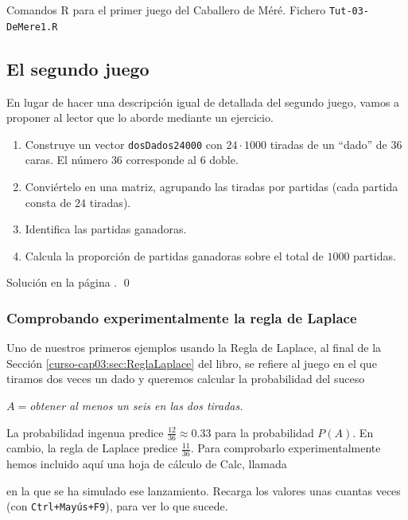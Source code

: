 \documentclass[10pt,a4paper]{article}\usepackage[]{graphicx}\usepackage[]{color}
\begin{document}
\begin{table}[h!]

\caption{Comandos R para el primer juego del Caballero de Méré. Fichero {\tt Tut-03-DeMere1.R}}
\label{tut03:tabla:FicheroTut-03-DeMere1}
\end{table}

\subsection{El segundo juego}
\label{tut03:subsec:SegundoJuego}

En lugar de hacer una descripción igual de detallada del segundo juego, vamos a proponer al lector que lo aborde mediante un ejercicio.

\begin{ejercicio}
\label{tut03:ejercicio11}
\quad
\begin{enumerate}
  \item Construye un vector {\tt dosDados24000} con $24\cdot 1000$ tiradas de un ``dado'' de 36 caras. El número $36$ corresponde al $6$ doble.
  \item Conviértelo en una matriz, agrupando las tiradas por partidas (cada partida consta de $24$ tiradas).
  \item Identifica las partidas ganadoras.
  \item Calcula la proporción de partidas ganadoras sobre el total de $1000$ partidas.
\end{enumerate}

Solución en la página \pageref{tut03:ejercicio11:sol}.
\qed
\end{ejercicio}


\subsubsection{Comprobando experimentalmente la regla de Laplace}
\label{tut03:subsubsec:ComprobandoExperimentalmenteReglaLaplace}

Uno de nuestros primeros ejemplos usando la Regla de Laplace, al final de la Sección \ref{curso-cap03:sec:ReglaLaplace} del libro, se refiere al juego en el que tiramos dos veces un dado y queremos calcular la probabilidad del suceso
    \begin{center}
      {\sf  $A=${\em obtener al menos un seis en las dos tiradas.} }
    \end{center}
La probabilidad ingenua predice $\frac{12}{36}\approx 0.33$ para la probabilidad $P(A)$. En cambio, la regla de Laplace predice $\frac{11}{36}$. Para comprobarlo experimentalmente hemos incluido aquí una hoja de cálculo de Calc, llamada
\begin{center}
\end{center}
en la que se ha simulado ese lanzamiento. Recarga los valores unas cuantas
veces (con {\tt Ctrl+Mayús+F9}), para ver lo que sucede.
\end{document}
